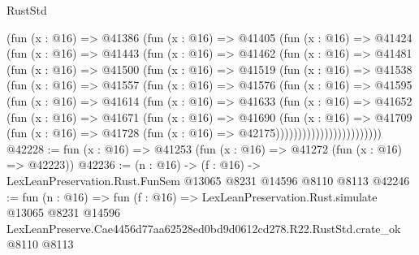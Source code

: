 \begin{lexlean}{RustStd}
\begin{coremodule}
            (fun (x : @16) =>
            @41386
              (fun (x : @16) =>
              @41405
                (fun (x : @16) =>
                @41424
                  (fun (x : @16) =>
                  @41443
                    (fun (x : @16) =>
                    @41462
                      (fun (x : @16) =>
                      @41481
                        (fun (x : @16) =>
                        @41500
                          (fun (x : @16) =>
                          @41519
                            (fun (x : @16) =>
                            @41538
                              (fun (x : @16) =>
                              @41557
                                (fun (x : @16) =>
                                @41576
                                  (fun (x : @16) =>
                                  @41595
                                    (fun (x : @16) =>
                                    @41614
                                      (fun (x : @16) =>
                                      @41633
                                        (fun (x : @16) =>
                                        @41652
                                          (fun (x : @16) =>
                                          @41671
                                            (fun (x : @16) =>
                                            @41690
                                              (fun (x : @16) =>
                                              @41709
                                                (fun (x : @16) =>
                                                @41728
                                                  (fun (x : @16) => @42175))))))))))))))))))))))))
@42228 := fun (x : @16) => @41253 (fun (x : @16) => @41272 (fun (x : @16) => @42223))
@42236 := (n : @16) -> (f : @16) -> LexLeanPreservation.Rust.FunSem @13065 @8231 @14596 @8110 @8113
@42246 := fun (n : @16) =>
  fun (f : @16) =>
  LexLeanPreservation.Rust.simulate
    @13065
    @8231
    @14596
    LexLeanPreserve.Cae4456d77aa62528ed0bd9d0612cd278.R22.RustStd.crate_ok
    @8110
    @8113
\end{coremodule}
\end{lexlean}
